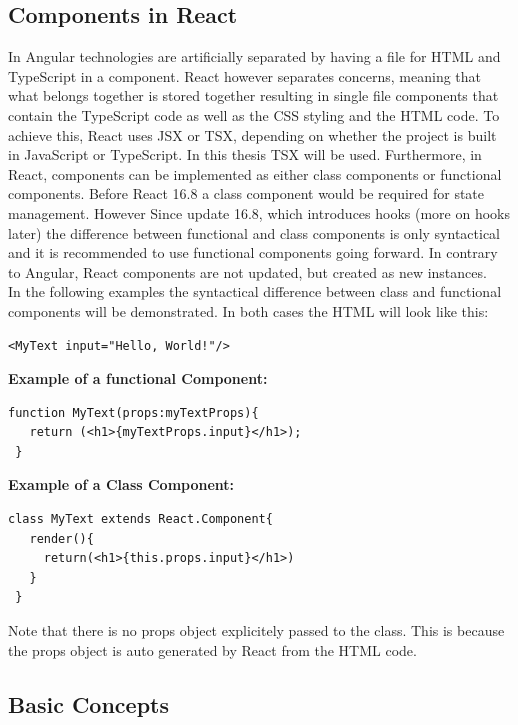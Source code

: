 \subsection{Components in React}
In Angular technologies are artificially separated by having a file for HTML and TypeScript in a component. React however separates concerns, meaning that what belongs together is stored together resulting in single file components that contain the TypeScript code as well as the CSS styling and the HTML code. To achieve this, React uses JSX or TSX, depending on whether the project is built in JavaScript or TypeScript. In this thesis TSX will be used. Furthermore, in React, components can be implemented as either class components or functional components. Before React 16.8 a class component would be required for state management. However Since update 16.8, which introduces hooks (more on hooks later) the difference between functional and class components is only syntactical and it is recommended to use functional components going forward. In contrary to Angular, React components are not updated, but created as new instances.\\[0.5cm]
In the following examples the syntactical difference between class and functional components will be demonstrated. In both cases the HTML will look like this:
\begin{Verbatim}[frame=single]
 <MyText input="Hello, World!"/>
\end{Verbatim}
\textbf{Example of a functional Component:}
\begin{Verbatim}[frame=single]
 function MyText(props:myTextProps){
   return (<h1>{myTextProps.input}</h1>);
 }
\end{Verbatim}
\textbf{Example of a Class Component:}
\begin{Verbatim}[frame=single]
 class MyText extends React.Component{
   render(){
     return(<h1>{this.props.input}</h1>)
   }			
 }
\end{Verbatim}
Note that there is no props object explicitely passed to the class. This is because the props object is auto generated by React from the HTML code.
\subsection{Basic Concepts}
